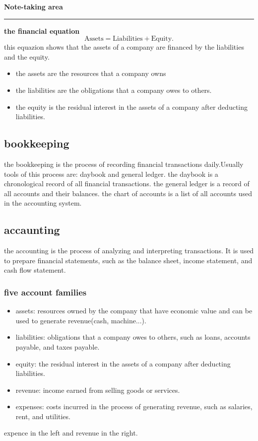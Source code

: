 \documentclass[12pt,a4paper]{report}
\begin{document}
\begin{minipage}[t]{0.69\textwidth}
    \textbf{Note-taking area}\\[0.5em]
    \rule{\linewidth}{0.4pt}
    \textbf{the financial equation} 
    \[ \boxed{\text{Assets}=\text{Liabilities}+\text{Equity}.} \]
 this equazion shows that the assets of a company are financed by the liabilities and the equity. 
 \begin{itemize}
    \item the assets are the resources that a company owns
    \item the liabilities are the obligations that a company owes to others. 
    \item the equity is the residual interest in the assets of a company after deducting liabilities.
 \end{itemize}
 \subsection*{bookkeeping} 
  the bookkeeping is the process of recording financial transactions daily.Usually tools of this process are: daybook and general ledger. the daybook is a chronological record of all financial transactions. the general ledger is a record of all accounts and their balances. the chart of accounts is a list of all accounts used in the accounting system.
    
 \subsection*{accaunting}the accounting is the process of analyzing and interpreting transactions. It is used to prepare financial statements, such as the balance sheet, income statement, and cash flow statement.
     \subsubsection*{five account families}
    \begin{itemize}
    \item assets: resources owned by the company that have economic value and can be used to generate revenue(cash, machine...).
    \item liabilities: obligations that a company owes to others, such as loans, accounts payable, and taxes payable.
    \item equity: the residual interest in the assets of a company after deducting liabilities.
    \item revenue: income earned from selling goods or services.
    \item expenses: costs incurred in the process of generating revenue, such as salaries, rent, and utilities.
    \end{itemize}
    expence in the left and revenue in the right.
\end{minipage}
\end{document}
